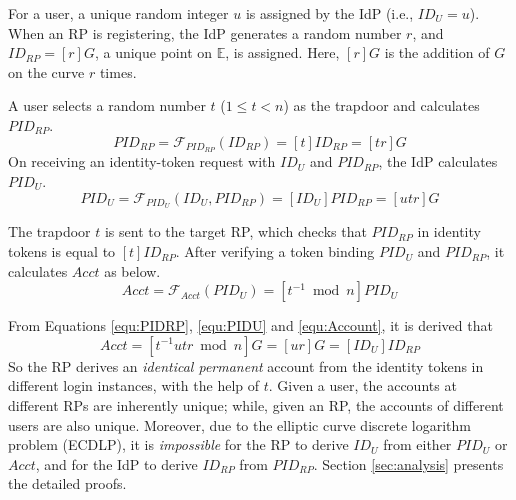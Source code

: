 For a user,
           a unique random integer $u$ is assigned by the IdP (i.e., $ID_U = u$).
When an RP is registering,
            the IdP generates a random number $r$, and $ID_{RP} = [r]G$, a unique point on $\mathbb{E}$, is assigned.
Here,
 $[r]G$ is the addition of $G$ on the curve $r$ times.

\vspace{0.4mm}
 A user selects a random number $t$ ($1 \leq t <n$) as the trapdoor
         and calculates $PID_{RP}$.
\begin{equation}
PID_{RP} = \mathcal{F}_{PID_{RP}}(ID_{RP}) = [t]{ID_{RP}} = [tr]G
\label{equ:PIDRP}
\end{equation}
On receiving an identity-token request with $ID_U$ and $PID_{RP}$,
    the IdP calculates $PID_{U}$.
\begin{equation}
PID_{U} = \mathcal{F}_{PID_U}(ID_U, PID_{RP}) =
  [{ID_U}]{PID_{RP}} = [utr]G
 \label{equ:PIDU}
\end{equation}


The trapdoor $t$ is sent to the target RP,
which checks that $PID_{RP}$ in identity tokens is equal to $[t]ID_{RP}$.
After verifying a token binding $PID_U$ and $PID_{RP}$,
    it calculates $Acct$ as below.
\begin{equation}
Acct = \mathcal{F}_{Acct}(PID_{U})
   = [t^{-1} \bmod n]PID_{U}
   \label{equ:Account}
\end{equation}

From Equations \ref{equ:PIDRP}, \ref{equ:PIDU} and \ref{equ:Account}, it is derived that
\begin{equation*}
   Acct =  [t^{-1}utr \bmod n]G = [ur]G = [ID_U]ID_{RP}
   \label{equ:AccountNotChanged}
\end{equation*}
So the RP derives an \emph{identical permanent} account from the identity tokens in different login instances,
    with the help of $t$. %
Given a user, the accounts at different RPs are inherently unique;
while, given an RP, the accounts of different users are also unique.
Moreover,
    due to the elliptic curve discrete logarithm problem (ECDLP),
it is \emph{impossible} for the RP to derive $ID_U$ from either $PID_U$ or $Acct$,
    and for the IdP to derive $ID_{RP}$ from $PID_{RP}$.
Section \ref{sec:analysis} presents the detailed proofs.


